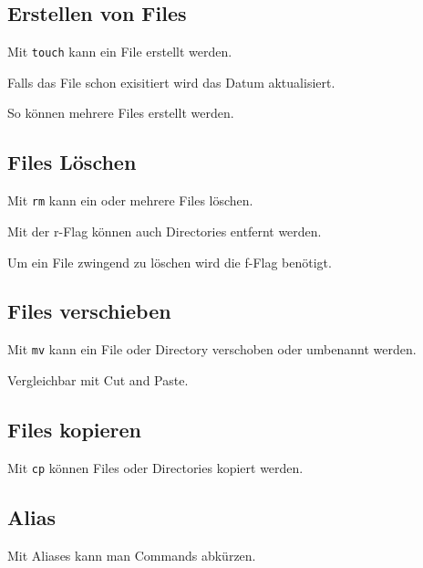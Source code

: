 \documentclass{article}
\begin{document}
\subsection{Erstellen von Files}

Mit \texttt{touch} kann ein File erstellt werden.

Falls das File schon exisitiert wird das Datum aktualisiert.

So können mehrere Files erstellt werden.

\subsection{Files Löschen}
Mit \texttt{rm} kann ein oder mehrere Files löschen.

Mit der r-Flag können auch Directories entfernt werden.

Um ein File zwingend zu löschen wird die f-Flag benötigt.

\subsection{Files verschieben}
Mit \texttt{mv} kann ein File oder Directory verschoben oder umbenannt werden.

Vergleichbar mit Cut and Paste.

\subsection{Files kopieren}

Mit \texttt{cp} können Files oder Directories kopiert werden.

\subsection{Alias}
Mit Aliases kann man Commands abkürzen.

\end{document}
